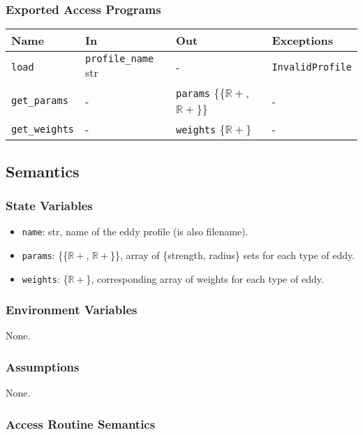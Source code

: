 \documentclass[12pt, titlepage]{article}
\begin{document}
\subsubsection{Exported Access Programs}

\begin{center}
\begin{tabular}{p{2.5cm} p{3.5cm} p{5cm} p{4cm}}
\hline
\textbf{Name} & \textbf{In} & \textbf{Out} & \textbf{Exceptions} \\
\hline
\texttt{load} & \texttt{profile\_name} str & - & \texttt{InvalidProfile} \\
\texttt{get\_params}& - & \texttt{params} \{{\{$\mathbb{R+}$, $\mathbb{R+}$\}}\} & - \\
\texttt{get\_weights}& - & \texttt{weights} \{$\mathbb{R+}$\} & - \\
\hline
\end{tabular}
\end{center}

\subsection{Semantics}

\subsubsection{State Variables}
\begin{itemize}
  \item \texttt{name}: str, name of the eddy profile (is also filename).
  \item \texttt{params}: \{{\{$\mathbb{R+}$, $\mathbb{R+}$\}}\}, array of \{strength, radius\} sets for each type of eddy.
  \item \texttt{weights}: \{$\mathbb{R+}$\}, corresponding array of weights for each type of eddy.
\end{itemize}

\subsubsection{Environment Variables}
None.

\subsubsection{Assumptions}
None.

\subsubsection{Access Routine Semantics}
\end{document}
